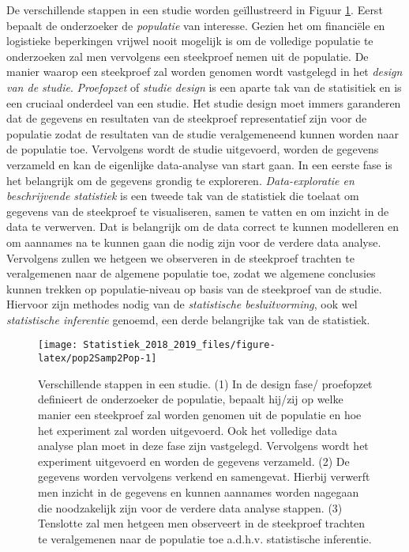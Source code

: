 \documentclass[12pt,dutch,coursenotes]{book}
\theoremstyle{definition}
\theoremstyle{definition}
\theoremstyle{definition}
\theoremstyle{remark}
\begin{document}
De verschillende stappen in een studie worden geïllustreerd in Figuur
\ref{fig:pop2Samp2Pop}. Eerst bepaalt de onderzoeker de \emph{populatie}
van interesse. Gezien het om financiële en logistieke beperkingen
vrijwel nooit mogelijk is om de volledige populatie te onderzoeken zal
men vervolgens een steekproef nemen uit de populatie. De manier waarop
een steekproef zal worden genomen wordt vastgelegd in het \emph{design
van de studie}. \emph{Proefopzet} of \emph{studie design} is een aparte
tak van de statisitiek en is een cruciaal onderdeel van een studie. Het
studie design moet immers garanderen dat de gegevens en resultaten van
de steekproef representatief zijn voor de populatie zodat de resultaten
van de studie veralgemeneend kunnen worden naar de populatie toe.
Vervolgens wordt de studie uitgevoerd, worden de gegevens verzameld en
kan de eigenlijke data-analyse van start gaan. In een eerste fase is het
belangrijk om de gegevens grondig te exploreren. \emph{Data-exploratie
en beschrijvende statistiek} is een tweede tak van de statistiek die
toelaat om gegevens van de steekproef te visualiseren, samen te vatten
en om inzicht in de data te verwerven. Dat is belangrijk om de data
correct te kunnen modelleren en om aannames na te kunnen gaan die nodig
zijn voor de verdere data analyse. Vervolgens zullen we hetgeen we
observeren in de steekproef trachten te veralgemenen naar de algemene
populatie toe, zodat we algemene conclusies kunnen trekken op
populatie-niveau op basis van de steekproef van de studie. Hiervoor zijn
methodes nodig van de \emph{statistische besluitvorming}, ook wel
\emph{statistische inferentie} genoemd, een derde belangrijke tak van de
statistiek.

\begin{figure}

{\centering \texttt{[image: Statistiek\_2018\_2019\_files/figure-latex/pop2Samp2Pop-1]} 

}

\caption{Verschillende stappen in een studie. (1) In de design fase/ proefopzet definieert de onderzoeker de populatie, bepaalt hij/zij op welke manier een steekproef zal worden genomen uit de populatie en hoe het experiment zal worden uitgevoerd. Ook het volledige data analyse plan moet in deze fase zijn vastgelegd. Vervolgens wordt het experiment uitgevoerd en worden de gegevens verzameld. (2) De gegevens worden vervolgens verkend en samengevat. Hierbij verwerft men inzicht in de gegevens en kunnen aannames worden nagegaan die noodzakelijk zijn voor de verdere data analyse stappen. (3) Tenslotte zal men hetgeen men observeert in de steekproef trachten te veralgemenen naar de populatie toe a.d.h.v. statistische inferentie.}\label{fig:pop2Samp2Pop}
\end{figure}
\end{document}
